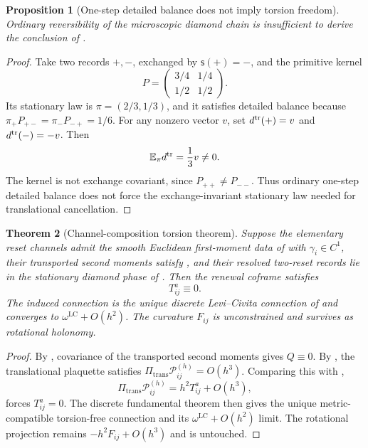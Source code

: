 \documentclass[11pt]{article}
\newtheorem{theorem}{Theorem}[section]
\newtheorem{proposition}[theorem]{Proposition}
\theoremstyle{definition}
\theoremstyle{remark}
\newcommand{\Pitr}{\Pi_{\mathrm{trans}}}
\newcommand{\Pcal}{\mathscr{P}}
\newcommand{\Fcal}{F}
\begin{document}
\begin{proposition}[One-step detailed balance does not imply torsion freedom]
\label{prop:detailed-balance-not-torsion}
Ordinary reversibility of the microscopic diamond chain is insufficient to
derive the conclusion of .
\end{proposition}

\begin{proof}
Take two records \(+,-\), exchanged by \(\mathsf s(+)= -\), and the primitive
kernel
\[
   P=\begin{pmatrix}3/4&1/4\\[2pt]1/2&1/2\end{pmatrix}.
\]
Its stationary law is \(\pi=(2/3,1/3)\), and it satisfies detailed balance
because \(\pi_+P_{+-}=\pi_-P_{-+}=1/6\).  For any nonzero vector \(v\), set
\(d^{\rm tr}(+)=v\) and \(d^{\rm tr}(-)=-v\).  Then
\[
   \mathbb E_\pi d^{\rm tr}=\frac13v\neq0.
\]
The kernel is not exchange covariant, since \(P_{++}\neq P_{--}\).  Thus
ordinary one-step detailed balance does not force the exchange-invariant
stationary law needed for translational cancellation.
\end{proof}

\begin{theorem}[Channel-composition torsion theorem]
\label{thm:channel-torsion}
Suppose the elementary reset channels admit the smooth Euclidean
first-moment data of  with \(\gamma_i\in C^1\), their
transported second moments satisfy , and
their resolved two-reset records lie in the stationary diamond phase of
.  Then the renewal coframe satisfies
\[
  T^a_{ij}\equiv0.
\]
The induced connection is the unique discrete Levi--Civita connection of
 and converges to
\(\omega^{\mathrm{LC}}+O(h^2)\).  The curvature \(\Fcal_{ij}\) is
unconstrained and survives as rotational holonomy.
\end{theorem}

\begin{proof}
By , covariance of the
transported second moments gives \(Q\equiv0\).  By
, the translational plaquette satisfies
\(\Pitr\Pcal_{ij}^{(h)}=O(h^3)\).  Comparing this with
,
\[
   \Pitr\Pcal_{ij}^{(h)}=h^2T^a_{ij}+O(h^3),
\]
forces \(T^a_{ij}=0\).  The discrete fundamental theorem then gives the unique
metric-compatible torsion-free connection and its
\(\omega^{\mathrm{LC}}+O(h^2)\) limit.  The rotational projection remains
\(-h^2\Fcal_{ij}+O(h^3)\) and is untouched.
\end{proof}
\end{document}
